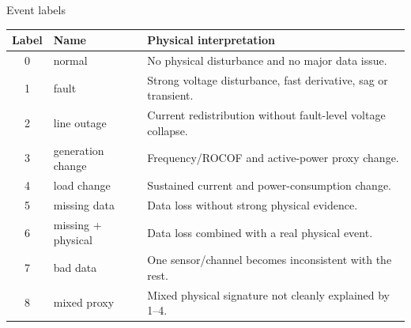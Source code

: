 \documentclass[10pt,aspectratio=169]{beamer}
\begin{document}
\begin{frame}{Event labels}
\small
\centering
\begin{tabular}{clp{}}
\toprule
\textbf{Label} & \textbf{Name} & \textbf{Physical interpretation}\\
\midrule
0 & normal & No physical disturbance and no major data issue.\\
1 & fault & Strong voltage disturbance, fast derivative, sag or transient.\\
2 & line outage & Current redistribution without fault-level voltage collapse.\\
3 & generation change & Frequency/ROCOF and active-power proxy change.\\
4 & load change & Sustained current and power-consumption change.\\
5 & missing data & Data loss without strong physical evidence.\\
6 & missing + physical & Data loss combined with a real physical event.\\
7 & bad data & One sensor/channel becomes inconsistent with the rest.\\
8 & mixed proxy & Mixed physical signature not cleanly explained by 1--4.\\
\bottomrule
\end{tabular}
\end{frame}
\end{document}
